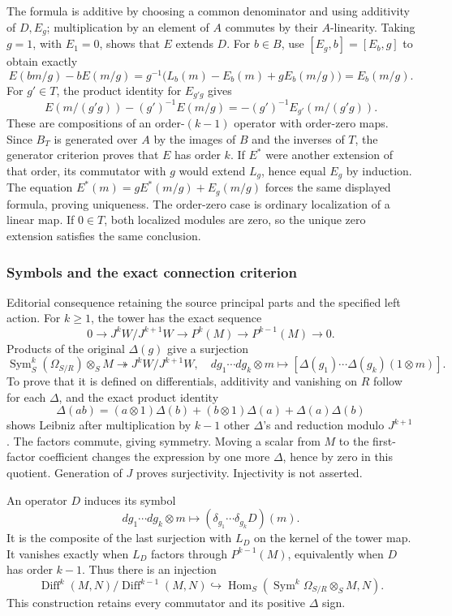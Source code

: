 The formula is additive by choosing a common denominator and using additivity of \(D,E_g\); multiplication by an element of \(A\) commutes by their \(A\)-linearity. Taking \(g=1\), with \(E_1=0\), shows that \(E\) extends \(D\). For \(b\in B\), use \([E_g,b]=[E_b,g]\) to obtain exactly \[
E(bm/g)-bE(m/g)
=g^{-1}\bigl(L_b(m)-E_b(m)+gE_b(m/g)\bigr)=E_b(m/g).
\] For \(g'\in T\), the product identity for \(E_{g'g}\) gives \[
E(m/(g'g))-(g')^{-1}E(m/g)=-(g')^{-1}E_{g'}(m/(g'g)).
\] These are compositions of an order-\((k-1)\) operator with order-zero maps. Since \(B_T\) is generated over \(A\) by the images of \(B\) and the inverses of \(T\), the generator criterion proves that \(E\) has order \(k\). If \(E^*\) were another extension of that order, its commutator with \(g\) would extend \(L_g\), hence equal \(E_g\) by induction. The equation \(E^*(m)=gE^*(m/g)+E_g(m/g)\) forces the same displayed formula, proving uniqueness. The order-zero case is ordinary localization of a linear map. If \(0\in T\), both localized modules are zero, so the unique zero extension satisfies the same conclusion.

\subsubsection{Symbols and the exact connection criterion}\label{algebra-proof-043-symbols-and-the-exact-connection-criterion}

Editorial consequence retaining the source principal parts and the specified left action. For \(k\ge1\), the tower has the exact sequence \[
0\longrightarrow J^kW/J^{k+1}W\longrightarrow P^k(M)\longrightarrow P^{k-1}(M)\longrightarrow0.
\] Products of the original \(\Delta(g)\) give a surjection \[
\operatorname{Sym}^k_S(\Omega_{S/R})\otimes_SM\twoheadrightarrow J^kW/J^{k+1}W,
\quad dg_1\cdots dg_k\otimes m\longmapsto[\Delta(g_1)\cdots\Delta(g_k)(1\otimes m)].
\] To prove that it is defined on differentials, additivity and vanishing on \(R\) follow for each \(\Delta\), and the exact product identity \[
\Delta(ab)=(a\otimes1)\Delta(b)+(b\otimes1)\Delta(a)+\Delta(a)\Delta(b)
\] shows Leibniz after multiplication by \(k-1\) other \(\Delta\)'s and reduction modulo \(J^{k+1}\). The factors commute, giving symmetry. Moving a scalar from \(M\) to the first-factor coefficient changes the expression by one more \(\Delta\), hence by zero in this quotient. Generation of \(J\) proves surjectivity. Injectivity is not asserted.

An operator \(D\) induces its symbol \[
dg_1\cdots dg_k\otimes m\longmapsto(\delta_{g_1}\cdots\delta_{g_k}D)(m).
\] It is the composite of the last surjection with \(L_D\) on the kernel of the tower map. It vanishes exactly when \(L_D\) factors through \(P^{k-1}(M)\), equivalently when \(D\) has order \(k-1\). Thus there is an injection \[
\operatorname{Diff}^k(M,N)/\operatorname{Diff}^{k-1}(M,N)
\hookrightarrow\operatorname{Hom}_S(\operatorname{Sym}^k\Omega_{S/R}\otimes_SM,N).
\] This construction retains every commutator and its positive \(\Delta\) sign.

